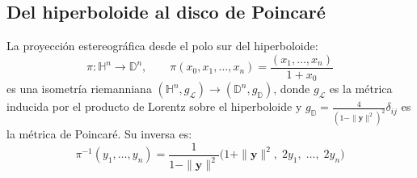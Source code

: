 \subsection{Del hiperboloide al disco de Poincaré}\label{subsec:isometria_hiperboloide_poincare}

\begin{theorem}\label{thm:isometria_hiperboloide_poincare}
La proyección estereográfica desde el polo sur del hiperboloide:
\begin{equation}\label{eq:proyeccion_estereografica_hiperboloide}
\pi: \mathbb{H}^n \to \mathbb{D}^n, \qquad \pi(x_0, x_1, \ldots, x_n) = \frac{(x_1, \ldots, x_n)}{1 + x_0}
\end{equation}
es una isometría riemanniana $(\mathbb{H}^n, g_{\mathcal{L}}) \to (\mathbb{D}^n, g_{\mathbb{D}})$, donde $g_{\mathcal{L}}$ es la métrica inducida por el producto de Lorentz sobre el hiperboloide y $g_{\mathbb{D}} = \frac{4}{(1-\|\mathbf{y}\|^2)^2}\delta_{ij}$ es la métrica de Poincaré. Su inversa es:
\begin{equation}\label{eq:inversa_proyeccion_estereografica}
\pi^{-1}(y_1, \ldots, y_n) = \frac{1}{1 - \|\mathbf{y}\|^2}\bigl(1 + \|\mathbf{y}\|^2,\; 2y_1,\; \ldots,\; 2y_n\bigr)
\end{equation}
\end{theorem}

